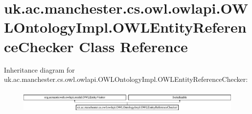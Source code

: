 \hypertarget{classuk_1_1ac_1_1manchester_1_1cs_1_1owl_1_1owlapi_1_1_o_w_l_ontology_impl_1_1_o_w_l_entity_reference_checker}{\section{uk.\-ac.\-manchester.\-cs.\-owl.\-owlapi.\-O\-W\-L\-Ontology\-Impl.\-O\-W\-L\-Entity\-Reference\-Checker Class Reference}
\label{classuk_1_1ac_1_1manchester_1_1cs_1_1owl_1_1owlapi_1_1_o_w_l_ontology_impl_1_1_o_w_l_entity_reference_checker}
}
Inheritance diagram for uk.\-ac.\-manchester.\-cs.\-owl.\-owlapi.\-O\-W\-L\-Ontology\-Impl.\-O\-W\-L\-Entity\-Reference\-Checker\-:\begin{figure}[H]
\begin{center}
\leavevmode
\includegraphics[height=1.178947cm]{classuk_1_1ac_1_1manchester_1_1cs_1_1owl_1_1owlapi_1_1_o_w_l_ontology_impl_1_1_o_w_l_entity_reference_checker}
\end{center}
\end{figure}

